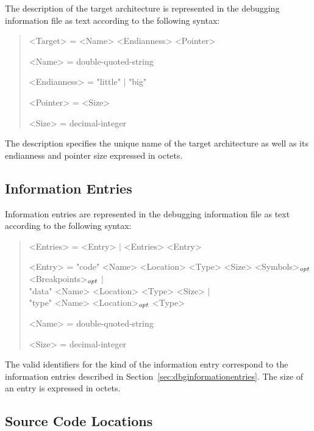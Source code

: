 The description of the target architecture is represented in the debugging information file as text according to the following syntax:

\begin{quote}\begin{grammar}
<Target> = <Name> <Endianness> <Pointer> \par
<Name> = double-quoted-string \par
<Endianness> = "little" $\mid$ "big" \par
<Pointer> = <Size> \par
<Size> = decimal-integer \par
\end{grammar}\end{quote}

The description specifies the unique name of the target architecture as well as its endianness and pointer size expressed in octets.

\subsection{Information Entries}

Information entries are represented in the debugging information file as text according to the following syntax:

\begin{quote}\begin{grammar}
<Entries> = <Entry> $\mid$ <Entries> <Entry> \par
<Entry> = "code" <Name> <Location> <Type> <Size> <Symbols>$_\mathit{opt}$ <Breakpoints>$_\mathit{opt}$ $\mid$ \\ "data" <Name> <Location> <Type> <Size> $\mid$ \\ "type" <Name> <Location>$_\mathit{opt}$ <Type> \par
<Name> = double-quoted-string \par
<Size> = decimal-integer \par
\end{grammar}\end{quote}

The valid identifiers for the kind of the information entry correspond to the information entries described in Section~\ref{sec:dbginformationentries}.
The size of an entry is expressed in octets.

\subsection{Source Code Locations}

